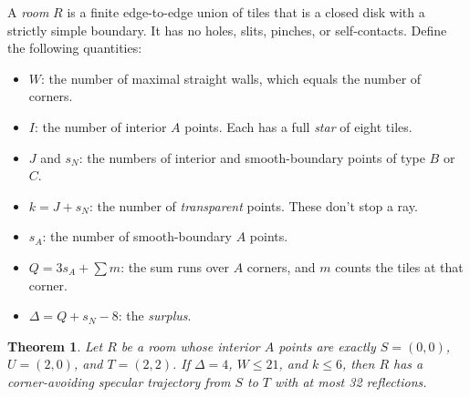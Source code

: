 \documentclass[11pt]{article}
\newtheorem{theorem}{Theorem}
\theoremstyle{remark}
\begin{document}
A \emph{room} $R$ is a finite edge-to-edge union of tiles that is a closed disk with a strictly simple boundary. It has no holes, slits, pinches, or self-contacts. Define the following quantities:
\begin{itemize}
\item $W$: the number of maximal straight walls, which equals the number of corners.
\item $I$: the number of interior $A$ points. Each has a full \emph{star} of eight tiles.
\item $J$ and $s_N$: the numbers of interior and smooth-boundary points of type $B$ or $C$.
\item $k=J+s_N$: the number of \emph{transparent} points. These don't stop a ray.
\item $s_A$: the number of smooth-boundary $A$ points.
\item $Q=3s_A+\sum m$: the sum runs over $A$ corners, and $m$ counts the tiles at that corner.
\item $\Delta=Q+s_N-8$: the \emph{surplus}.
\end{itemize}

\begin{theorem}\label{thm:main}
Let $R$ be a room whose interior $A$ points are exactly $S=(0,0)$, $U=(2,0)$, and $T=(2,2)$. If $\Delta=4$, $W\le21$, and $k\le6$, then $R$ has a corner-avoiding specular trajectory from $S$ to $T$ with at most 32 reflections.
\end{theorem}
\end{document}
